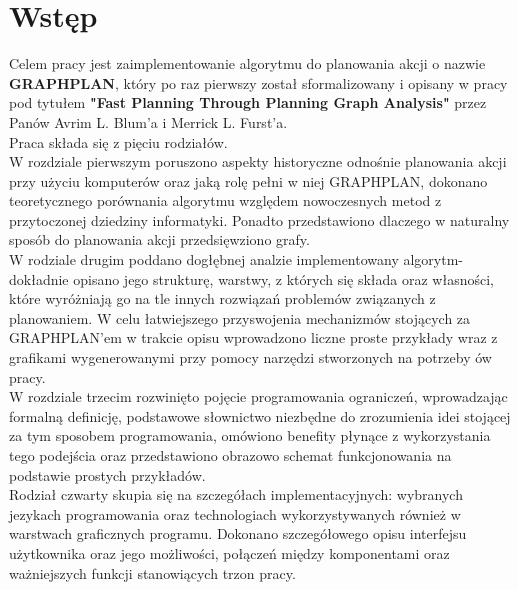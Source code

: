 \chapter*{Wstęp}

\thispagestyle{chapterBeginStyle}

Celem pracy jest zaimplementowanie algorytmu do planowania akcji o nazwie \textbf{GRAPHPLAN}, który po raz pierwszy został sformalizowany i opisany w pracy pod tytułem
\textbf{"Fast Planning Through Planning Graph Analysis"}\cite{GRAPHPLAN} przez Panów Avrim L. Blum'a i Merrick L. Furst'a.
\\
Praca składa się z pięciu rodziałów.
\\

	W rozdziale pierwszym poruszono aspekty historyczne odnośnie planowania akcji przy użyciu komputerów oraz jaką rolę pełni w niej GRAPHPLAN,
dokonano teoretycznego porównania algorytmu względem nowoczesnych metod z przytoczonej dziedziny informatyki. Ponadto przedstawiono dlaczego
w naturalny sposób do planowania akcji przedsięwziono grafy.
\\

	W rodziale drugim poddano dogłębnej analzie implementowany algorytm- dokładnie opisano jego strukturę, warstwy, z których się składa oraz własności,
które wyróżniają go na tle innych rozwiązań problemów związanych z planowaniem. W celu łatwiejszego przyswojenia mechanizmów stojących
za GRAPHPLAN'em w trakcie opisu wprowadzono liczne proste przykłady wraz z grafikami wygenerowanymi przy pomocy narzędzi stworzonych
na potrzeby ów pracy.
\\

	W rozdziale trzecim rozwinięto pojęcie programowania ograniczeń, wprowadzając formalną definicję, podstawowe słownictwo niezbędne do 
	zrozumienia idei stojącej za tym sposobem programowania, omówiono benefity płynące z wykorzystania tego podejścia oraz przedstawiono
	obrazowo schemat funkcjonowania na podstawie prostych przykładów.
\\

	Rodział czwarty skupia się na szczegółach implementacyjnych: wybranych jezykach programowania oraz technologiach wykorzystywanych również
w warstwach graficznych programu. Dokonano szczegółowego opisu interfejsu użytkownika oraz jego możliwości, połączeń między komponentami oraz 
ważniejszych funkcji stanowiących trzon pracy.
\\

